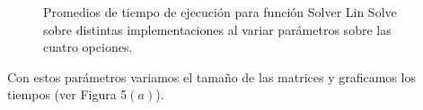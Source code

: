  \begin{figure}[htbp]
\centering


\caption{Promedios de tiempo de ejecución para función Solver Lin Solve sobre distintas implementaciones al variar parámetros sobre las cuatro opciones.} \label{fig:lego}
\end{figure}

Con estos parámetros variamos el tamaño de las matrices y graficamos los tiempos (ver Figura 5$(a)$).

  

